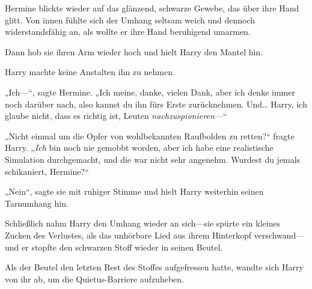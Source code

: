 Hermine blickte wieder auf das glänzend, schwarze Gewebe, das über ihre Hand glitt. Von innen fühlte sich der Umhang seltsam weich und dennoch widerstandsfähig an, als wollte er ihre Hand beruhigend umarmen.

Dann hob sie ihren Arm wieder hoch und hielt Harry den Mantel hin.

Harry machte keine Anstalten ihn zu nehmen.

„Ich—“, sagte Hermine. „Ich meine, danke, vielen Dank, aber ich denke immer noch darüber nach, also kannst du ihn fürs Erste zurücknehmen. Und… Harry, ich glaube nicht, dass es richtig ist, Leuten \emph{nachzuspionieren}—“

„Nicht einmal um die Opfer von wohlbekannten Raufbolden zu retten?“ fragte Harry. „\emph{Ich} bin noch nie gemobbt worden, aber ich habe eine realistische Simulation durchgemacht, und die war nicht sehr angenehm. Wurdest du jemals schikaniert, Hermine?“

„Nein“, sagte sie mit ruhiger Stimme und hielt Harry weiterhin seinen Tarnumhang hin.

Schließlich nahm Harry den Umhang wieder an sich—sie spürte ein kleines Zucken des Verlustes, als das unhörbare Lied aus ihrem Hinterkopf verschwand—und er stopfte den schwarzen Stoff wieder in seinen Beutel.

Als der Beutel den letzten Rest des Stoffes aufgefressen hatte, wandte sich Harry von ihr ab, um die Quietus-Barriere aufzuheben.

